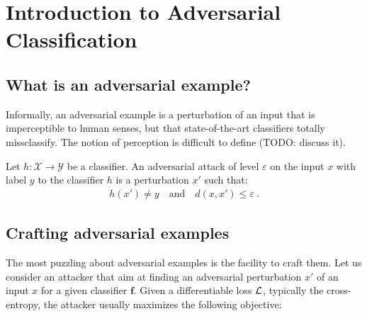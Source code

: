 
\section{Introduction to Adversarial Classification}
\subsection{What is an adversarial example?}

Informally, an adversarial example is a perturbation of an input that is imperceptible to human senses, but that state-of-the-art classifiers totally missclassify. The notion of perception is difficult to define (TODO: discuss it). 


\begin{definition} 
    Let $h:\mathcal{X}\to\mathcal{Y}$ be a classifier. An adversarial attack of level $\varepsilon$ on the input $x$ with label $y$ to the classifier $h$ is a perturbation $x'$ such that:
    \begin{align*}
        h(x')\neq y\quad\text{and}\quad d(x,x')\leq\varepsilon~.
    \end{align*}
\end{definition}


\subsection{Crafting adversarial examples}

The most puzzling about adversarial examples is the facility to craft them. Let us consider an attacker that aim at finding an adversarial perturbation $x'$ of an input $x$ for a given classifier $\mathbf{f}$.  Given a differentiable loss $\mathcal{L}$, typically the cross-entropy, the attacker usually maximizes the following objective:

